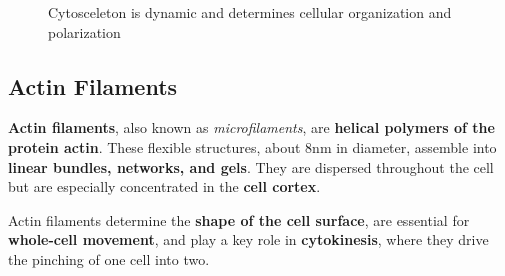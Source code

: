 \documentclass[../main.tex]{subfiles}
\begin{document}
\begin{figure}[H]
	\centering
	\caption{Cytosceleton is dynamic and determines cellular organization and polarization}
\end{figure}

\subsection{Actin Filaments}
\textbf{Actin filaments}, also known as \textit{microfilaments}, are \textbf{helical polymers of the protein actin}. These flexible structures, about 8nm in diameter, assemble into \textbf{linear bundles, networks, and gels}. They are dispersed throughout the cell but are especially concentrated in the \textbf{cell cortex}. 

Actin filaments determine the \textbf{shape of the cell surface}, are essential for \textbf{whole-cell movement}, and play a key role in \textbf{cytokinesis}, where they drive the pinching of one cell into two. 
\end{document}

